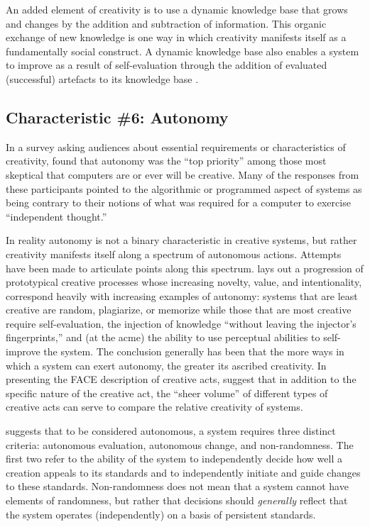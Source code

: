 \documentclass[phd,electronic,oneside,twosidetoc,letterpaper,chaptercenter,parttop,lof,lot]{byumsphd}
\begin{document}
An added element of creativity is to use a dynamic knowledge base that grows and changes by the addition and subtraction of information. This organic exchange of new knowledge is one way in which creativity manifests itself as a fundamentally social construct. A dynamic knowledge base also enables a system to improve as a result of self-evaluation through the addition of evaluated (successful) artefacts to its knowledge base \citep{perez2004three}.

\subsection{Characteristic \#6: Autonomy}

In a survey asking audiences about essential requirements or characteristics of creativity, \citeauthor{mumford2015man} \cite{mumford2015man} found that autonomy was the ``top priority'' among those most skeptical that computers are or ever will be creative. Many of the responses from these participants pointed to the algorithmic or programmed aspect of systems as being contrary to their notions of what was required for a computer to exercise ``independent thought.''

In reality autonomy is not a binary characteristic in creative systems, but rather creativity manifests itself along a spectrum of autonomous actions. Attempts have been made to articulate points along this spectrum. \citeauthor{Ventura2016} \cite{Ventura2016} lays out a progression of prototypical creative processes whose increasing novelty, value, and intentionality, correspond heavily with increasing examples of autonomy: systems that are least creative are random, plagiarize, or memorize while those that are most creative require self-evaluation, the injection of knowledge ``without leaving the injector's fingerprints,'' and (at the acme) the ability to use perceptual abilities to self-improve the system. The conclusion generally has been that the more ways in which a system can exert autonomy, the greater its ascribed creativity. In presenting the FACE description of creative acts, \citeauthor{Colton2011} \cite{Colton2011} suggest that in addition to the specific nature of the creative act, the ``sheer volume'' of different types of creative acts can serve to compare the relative creativity of systems.

\citeauthor{Jennings2010DevelopingIntelligence} \cite{Jennings2010DevelopingIntelligence} suggests that to be considered autonomous, a system requires three distinct criteria: autonomous evaluation, autonomous change, and non-randomness. The first two refer to the ability of the system to independently decide how well a creation appeals to its standards and to independently initiate and guide changes to these standards. Non-randomness does not mean that a system cannot have elements of randomness, but rather that decisions should \textit{generally} reflect that the system operates (independently) on a basis of persistent standards.
\end{document}
